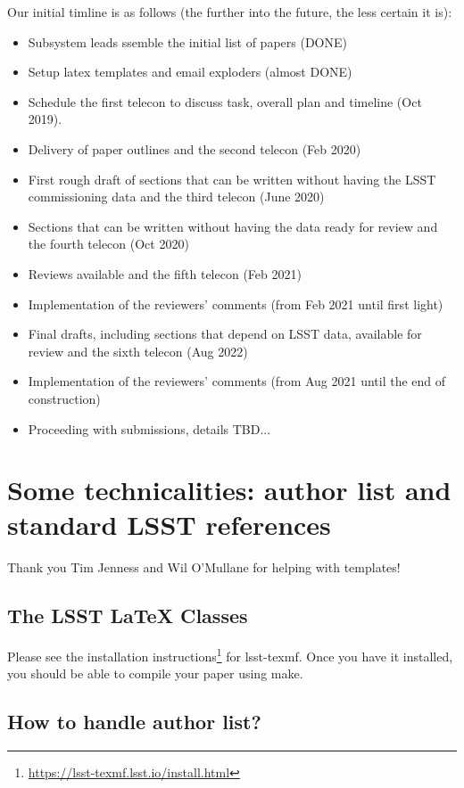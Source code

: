 Our initial timline is as follows (the further into the future, the less certain it is): 
\begin{itemize} 
\item 
Subsystem leads ssemble the initial list of papers (DONE)
\item
Setup latex templates and email exploders (almost DONE)
\item
Schedule the first telecon to discuss task, overall plan and timeline (Oct 2019).
\item 
Delivery of paper outlines and the second telecon (Feb 2020)
\item
First rough draft of sections that can be written without having the LSST commissioning
data and the third telecon (June 2020)
\item 
Sections that can be written without having the data ready for review and
the fourth telecon (Oct 2020)
\item
Reviews available and the fifth telecon (Feb 2021)
\item
Implementation of the reviewers' comments (from Feb 2021 until first light) 
\item 
Final drafts, including sections that depend on LSST data, available for
review and the sixth telecon (Aug 2022)
\item
Implementation of the reviewers' comments (from Aug 2021 until the end of construction)  
\item
Proceeding with submissions, details TBD...
\end{itemize}




\section{Some technicalities: author list and standard LSST references} 

Thank you Tim Jenness and Wil O'Mullane for helping with templates! 

\subsection{The LSST LaTeX Classes}

Please see the installation instructions\footnote{\url{https://lsst-texmf.lsst.io/install.html}} 
for lsst-texmf. Once you have it installed, you should be able to compile your paper
using make. 

\subsection{How to handle author list?} 

